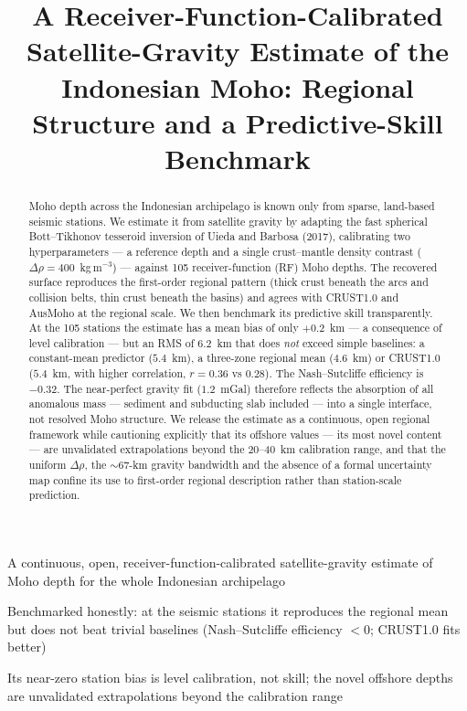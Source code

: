 \documentclass{agujournal2019}
\begin{document}
\title{A Receiver-Function-Calibrated Satellite-Gravity Estimate of the Indonesian
Moho: Regional Structure and a Predictive-Skill Benchmark}


\begin{keypoints}
\item A continuous, open, receiver-function-calibrated satellite-gravity estimate of
Moho depth for the whole Indonesian archipelago
\item Benchmarked honestly: at the seismic stations it reproduces the regional mean
but does not beat trivial baselines (Nash--Sutcliffe efficiency $<0$; CRUST1.0 fits
better)
\item Its near-zero station bias is level calibration, not skill; the novel offshore
depths are unvalidated extrapolations beyond the calibration range
\end{keypoints}

\begin{abstract}
Moho depth across the Indonesian archipelago is known only from sparse, land-based
seismic stations. We estimate it from satellite gravity by adapting the fast
spherical Bott--Tikhonov tesseroid inversion of Uieda and Barbosa (2017),
calibrating two hyperparameters --- a reference depth and a single crust--mantle
density contrast ($\Delta\rho=400$~kg\,m$^{-3}$) --- against 105 receiver-function
(RF) Moho depths. The recovered surface reproduces the first-order regional pattern
(thick crust beneath the arcs and collision belts, thin crust beneath the basins)
and agrees with {CRUST1.0} and {AusMoho} at the regional scale. We then benchmark
its predictive skill transparently. At the 105 stations the estimate has a mean bias
of only $+0.2$~km --- a consequence of level calibration --- but an RMS of $6.2$~km
that does \emph{not} exceed simple baselines: a constant-mean predictor ($5.4$~km),
a three-zone regional mean ($4.6$~km) or {CRUST1.0} ($5.4$~km, with higher
correlation, $r=0.36$ vs $0.28$). The Nash--Sutcliffe efficiency is $-0.32$. The
near-perfect gravity fit ($1.2$~mGal) therefore reflects the absorption of all
anomalous mass --- sediment and subducting slab included --- into a single
interface, not resolved Moho structure. We release the estimate as a continuous,
open regional framework while cautioning explicitly that its offshore values --- its
most novel content --- are unvalidated extrapolations beyond the 20--40~km
calibration range, and that the uniform $\Delta\rho$, the $\sim$67-km gravity
bandwidth and the absence of a formal uncertainty map confine its use to first-order
regional description rather than station-scale prediction.
\end{abstract}
\end{document}

